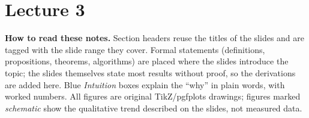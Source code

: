 \documentclass[11pt,a4paper]{article}
\newcommand{\Surf}{\mathcal{S}}
\newcommand{\vx}{\bm{x}}
\newcommand{\vn}{\bm{n}}
\newcommand{\vy}{\bm{y}}
\theoremstyle{definition}
\theoremstyle{plain}
\theoremstyle{remark}
\begin{document}



\newpage

\setcounter{section}{0}
\renewcommand{\thesection}{\arabic{section}}
\part{Lecture 3}

\begin{tcolorbox}[colback=gray!6,colframe=gray!60,boxrule=0.5pt,arc=2pt]
\textbf{How to read these notes.} Section headers reuse the titles of the slides and are tagged with the slide range they cover. Formal statements (definitions, propositions, theorems, algorithms) are placed where the slides introduce the topic; the slides themselves state most results without proof, so the derivations are added here. Blue \emph{Intuition} boxes explain the ``why'' in plain words, with worked numbers. All figures are original TikZ/pgfplots drawings; figures marked \emph{schematic} show the qualitative trend described on the slides, not measured data.
\end{tcolorbox}
\end{document}

